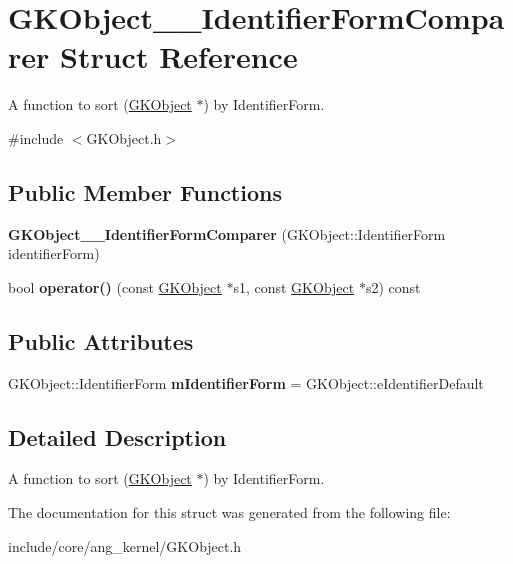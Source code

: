 \hypertarget{structGKObject____IdentifierFormComparer}{}\section{G\+K\+Object\+\_\+\+\_\+\+Identifier\+Form\+Comparer Struct Reference}
\label{structGKObject____IdentifierFormComparer}


A function to sort (\hyperlink{classGKObject}{G\+K\+Object} $\ast$) by Identifier\+Form.  




{\ttfamily \#include $<$G\+K\+Object.\+h$>$}

\subsection*{Public Member Functions}
\begin{DoxyCompactItemize}
\item 
{\bfseries G\+K\+Object\+\_\+\+\_\+\+Identifier\+Form\+Comparer} (G\+K\+Object\+::\+Identifier\+Form identifier\+Form)\hypertarget{structGKObject____IdentifierFormComparer_a6bdc5921d0cc63aef1ee03720abf9b99}{}\label{structGKObject____IdentifierFormComparer_a6bdc5921d0cc63aef1ee03720abf9b99}

\item 
bool {\bfseries operator()} (const \hyperlink{classGKObject}{G\+K\+Object} $\ast$s1, const \hyperlink{classGKObject}{G\+K\+Object} $\ast$s2) const \hypertarget{structGKObject____IdentifierFormComparer_ad49e52d918a9add0a1a3a39db2f3880a}{}\label{structGKObject____IdentifierFormComparer_ad49e52d918a9add0a1a3a39db2f3880a}

\end{DoxyCompactItemize}
\subsection*{Public Attributes}
\begin{DoxyCompactItemize}
\item 
G\+K\+Object\+::\+Identifier\+Form {\bfseries m\+Identifier\+Form} = G\+K\+Object\+::e\+Identifier\+Default\hypertarget{structGKObject____IdentifierFormComparer_ab90cdd070d3a7a778351262ee7eacecd}{}\label{structGKObject____IdentifierFormComparer_ab90cdd070d3a7a778351262ee7eacecd}

\end{DoxyCompactItemize}


\subsection{Detailed Description}
A function to sort (\hyperlink{classGKObject}{G\+K\+Object} $\ast$) by Identifier\+Form. 

The documentation for this struct was generated from the following file\+:\begin{DoxyCompactItemize}
\item 
include/core/ang\+\_\+kernel/G\+K\+Object.\+h\end{DoxyCompactItemize}
